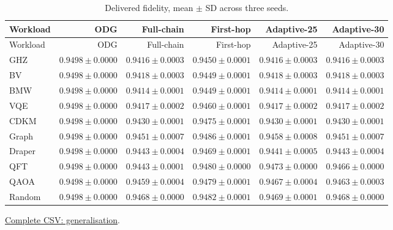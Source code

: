 \begin{center}\small
\begin{longtable}{lrrrrr}
\caption{Delivered fidelity, mean $\pm$ SD across three seeds.}\\
\toprule
Workload & ODG & Full-chain & First-hop & Adaptive-25 & Adaptive-30 \\
\midrule\endfirsthead
\toprule
Workload & ODG & Full-chain & First-hop & Adaptive-25 & Adaptive-30 \\
\midrule\endhead
GHZ & $0.9498 \pm 0.0000$ & $0.9416 \pm 0.0003$ & $0.9450 \pm 0.0001$ & $0.9416 \pm 0.0003$ & $0.9416 \pm 0.0003$ \\
BV & $0.9498 \pm 0.0000$ & $0.9418 \pm 0.0003$ & $0.9449 \pm 0.0001$ & $0.9418 \pm 0.0003$ & $0.9418 \pm 0.0003$ \\
BMW & $0.9498 \pm 0.0000$ & $0.9414 \pm 0.0001$ & $0.9449 \pm 0.0001$ & $0.9414 \pm 0.0001$ & $0.9414 \pm 0.0001$ \\
VQE & $0.9498 \pm 0.0000$ & $0.9417 \pm 0.0002$ & $0.9460 \pm 0.0001$ & $0.9417 \pm 0.0002$ & $0.9417 \pm 0.0002$ \\
CDKM & $0.9498 \pm 0.0000$ & $0.9430 \pm 0.0001$ & $0.9475 \pm 0.0001$ & $0.9430 \pm 0.0001$ & $0.9430 \pm 0.0001$ \\
Graph & $0.9498 \pm 0.0000$ & $0.9451 \pm 0.0007$ & $0.9486 \pm 0.0001$ & $0.9458 \pm 0.0008$ & $0.9451 \pm 0.0007$ \\
Draper & $0.9498 \pm 0.0000$ & $0.9443 \pm 0.0004$ & $0.9469 \pm 0.0001$ & $0.9441 \pm 0.0005$ & $0.9443 \pm 0.0004$ \\
QFT & $0.9498 \pm 0.0000$ & $0.9443 \pm 0.0001$ & $0.9480 \pm 0.0000$ & $0.9473 \pm 0.0000$ & $0.9466 \pm 0.0000$ \\
QAOA & $0.9498 \pm 0.0000$ & $0.9459 \pm 0.0004$ & $0.9479 \pm 0.0001$ & $0.9467 \pm 0.0004$ & $0.9463 \pm 0.0003$ \\
Random & $0.9498 \pm 0.0000$ & $0.9468 \pm 0.0000$ & $0.9482 \pm 0.0001$ & $0.9469 \pm 0.0001$ & $0.9468 \pm 0.0000$ \\
\bottomrule\end{longtable}\end{center}
{\footnotesize \href{https://github.com/sanjeevkrishnaa/Compiler-Driven-ACE/blob/codex/ace-scheduler-correctness/docs/latex/oct25_pre_golden/data/generalisation.csv}{Complete CSV: generalisation}. }


